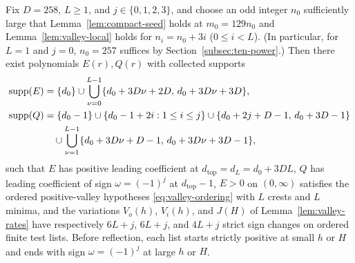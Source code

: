 \begin{lemma}\label{lem:inductive-valleys}
Fix $D=258$, $L\ge 1$, and $j\in\{0,1,2,3\}$, and choose an odd integer $n_0$ sufficiently large that
Lemma~\ref{lem:compact-seed} holds at $m_0=129n_0$ and Lemma~\ref{lem:valley-local} holds for
$n_i=n_0+3i$ ($0\le i<L$). (In particular, for $L=1$ and $j=0$, $n_0=257$ suffices by
Section~\ref{subsec:ten-power}.) Then there exist polynomials $E(r),Q(r)$ with collected supports
\begin{align*}
  \operatorname{supp}(E) &= \{d_0\} \cup \bigcup_{\nu=0}^{L-1}\{d_0+3D\nu+2D,\, d_0+3D\nu+3D\}, \\
  \operatorname{supp}(Q) &= \{d_0-1\} \cup \{d_0-1+2i:1\le i\le j\} \cup \{d_0+2j+D-1,\, d_0+3D-1\} \\
           &\quad \cup \bigcup_{\nu=1}^{L-1}\{d_0+3D\nu+D-1,\, d_0+3D\nu+3D-1\},
\end{align*}
such that $E$ has positive leading coefficient at $d_{\mathrm{top}}=d_L=d_0+3DL$, $Q$ has leading
coefficient of sign $\omega=(-1)^j$ at $d_{\mathrm{top}}-1$, $E>0$ on $(0,\infty)$ satisfies the
ordered positive-valley hypotheses \eqref{eq:valley-ordering} with $L$ crests and $L$ minima, and the
variations $V_o(h)$, $V_i(h)$, and $J(H)$ of Lemma~\ref{lem:valley-rates} have respectively $6L+j$,
$6L+j$, and $4L+j$ strict sign changes on ordered finite test lists. Before reflection, each list
starts strictly positive at small $h$ or $H$ and ends with sign $\omega=(-1)^j$ at large $h$ or $H$.
\end{lemma}

